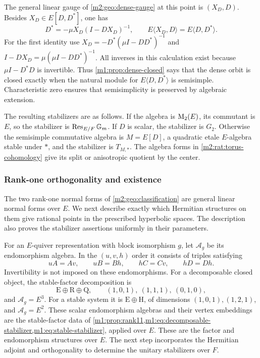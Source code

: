 The general linear gauge of \eqref{m2:geo:dense-gauge} at this
point is $(X_D,D)$.  Besides $X_D\in E[D,D^*]$, one has
\begin{equation}\label{m2:rat:dense-algebra}
 D^*=-\mu X_D(I-DX_D)^{-1},
 \qquad E\langle X_D,D\rangle=E\langle D,D^*\rangle.
\end{equation}
For the first identity use
$X_D=-D^*(\mu I-DD^*)^{-1}$ and
$I-DX_D=\mu(\mu I-DD^*)^{-1}$.
All inverses in this calculation exist because
$\mu I-D^*D$ is invertible.  Thus
\cref{m1:prop:dense-closed} says that the dense orbit is closed
exactly when the natural module for $E\langle D,D^*\rangle$
is semisimple.  Characteristic zero ensures that
semisimplicity is preserved by algebraic extension.

The resulting stabilizers are as follows.  If the algebra is
$\operatorname{M}_2(E)$, its commutant is $E$, so the stabilizer is
$\operatorname{Res}_{E/F}\mathbb G_m$.  If $D$ is scalar, the stabilizer is
$G_2$.  Otherwise the semisimple commutative algebra is
$M=E[D]$, a quadratic etale $E$-algebra stable under $*$,
and the stabilizer is $T_{M,*}$. The algebra forms in
\cref{m2:rat:torus-cohomology} give its split or anisotropic quotient
by the center.

\subsubsection{Rank-one orthogonality and existence}



The two rank-one normal forms of \cref{m2:geo:classification} are
general linear normal forms over $E$.  We next describe
exactly which Hermitian structures on them give rational
points in the prescribed hyperbolic spaces.  The description
also proves the stabilizer assertions uniformly in their
parameters.

For an $E$-quiver representation with block isomorphism $g$,
let $\mathscr A_g$ be its endomorphism algebra.  In the
$(u,v,h)$ order it consists of triples satisfying
\begin{equation}\label{m2:rat:endo-equations}
 uA=Av,\qquad uB=Bh,\qquad hC=Cv,\qquad hD=Dh.
\end{equation}
Invertibility is not imposed on these endomorphisms.
For a decomposable closed object, the stable-factor
decomposition is
\[
 \mathrm E\oplus\mathrm R\oplus\mathrm Q,
 \qquad
 (1,0,1),\ (1,1,1),\ (0,1,0),
\]
and $\mathscr A_g=E^3$.  For a stable system it is
$\mathrm E\oplus\mathrm H$, of dimensions
$(1,0,1),(1,2,1)$, and $\mathscr A_g=E^2$.
These scalar endomorphism algebras and their vertex embeddings
are the stable-factor data of \cref{m1:prop:rank11,m1:eq:decomposable-stabilizer,m1:eq:stable-stabilizer}, applied over $E$.
These are the factor and endomorphism structures over $E$. The next
step incorporates the Hermitian adjoint and orthogonality to determine
the unitary stabilizers over $F$.

